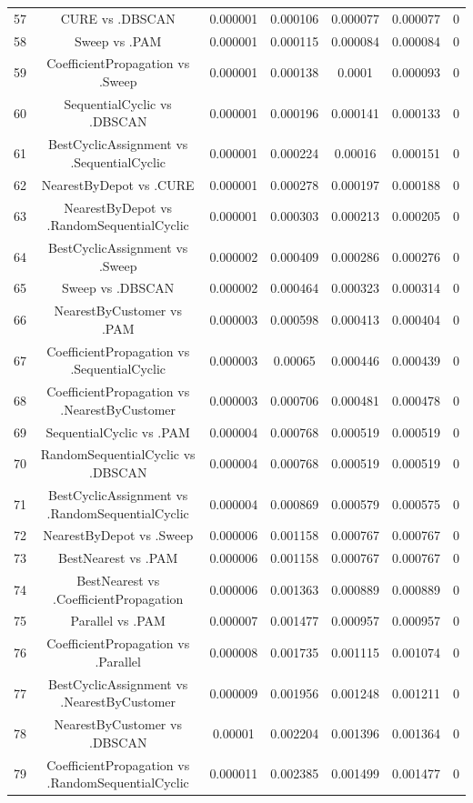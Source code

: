 \documentclass[a4paper,10pt]{article}
\begin{document}
\begin{landscape}
\begin{table}[!htp]
\begin{tabular}{ccccccc}
57&CURE vs .DBSCAN&0.000001&0.000106&0.000077&0.000077&0\\
58&Sweep vs .PAM&0.000001&0.000115&0.000084&0.000084&0\\
59&CoefficientPropagation vs .Sweep&0.000001&0.000138&0.0001&0.000093&0\\
60&SequentialCyclic vs .DBSCAN&0.000001&0.000196&0.000141&0.000133&0\\
61&BestCyclicAssignment vs .SequentialCyclic&0.000001&0.000224&0.00016&0.000151&0\\
62&NearestByDepot vs .CURE&0.000001&0.000278&0.000197&0.000188&0\\
63&NearestByDepot vs .RandomSequentialCyclic&0.000001&0.000303&0.000213&0.000205&0\\
64&BestCyclicAssignment vs .Sweep&0.000002&0.000409&0.000286&0.000276&0\\
65&Sweep vs .DBSCAN&0.000002&0.000464&0.000323&0.000314&0\\
66&NearestByCustomer vs .PAM&0.000003&0.000598&0.000413&0.000404&0\\
67&CoefficientPropagation vs .SequentialCyclic&0.000003&0.00065&0.000446&0.000439&0\\
68&CoefficientPropagation vs .NearestByCustomer&0.000003&0.000706&0.000481&0.000478&0\\
69&SequentialCyclic vs .PAM&0.000004&0.000768&0.000519&0.000519&0\\
70&RandomSequentialCyclic vs .DBSCAN&0.000004&0.000768&0.000519&0.000519&0\\
71&BestCyclicAssignment vs .RandomSequentialCyclic&0.000004&0.000869&0.000579&0.000575&0\\
72&NearestByDepot vs .Sweep&0.000006&0.001158&0.000767&0.000767&0\\
73&BestNearest vs .PAM&0.000006&0.001158&0.000767&0.000767&0\\
74&BestNearest vs .CoefficientPropagation&0.000006&0.001363&0.000889&0.000889&0\\
75&Parallel vs .PAM&0.000007&0.001477&0.000957&0.000957&0\\
76&CoefficientPropagation vs .Parallel&0.000008&0.001735&0.001115&0.001074&0\\
77&BestCyclicAssignment vs .NearestByCustomer&0.000009&0.001956&0.001248&0.001211&0\\
78&NearestByCustomer vs .DBSCAN&0.00001&0.002204&0.001396&0.001364&0\\
79&CoefficientPropagation vs .RandomSequentialCyclic&0.000011&0.002385&0.001499&0.001477&0\\

\end{tabular}
\end{table}
\end{landscape}
\end{document}
